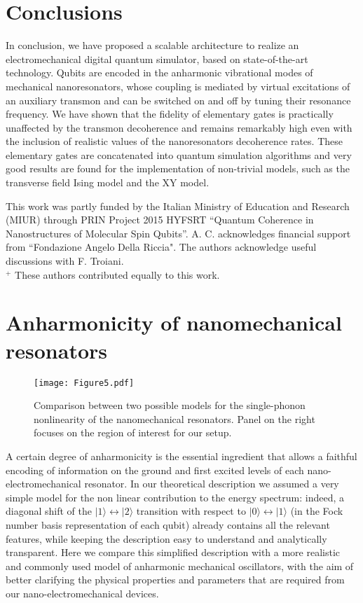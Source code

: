 \documentclass[aps,twocolumn,groupedaddress,superscriptaddress,floatfix,amsmath,amssymb,prb]{revtex4-1}
\begin{document}
\section{Conclusions}
In conclusion, we have proposed a scalable architecture to realize an electromechanical digital quantum simulator, based on state-of-the-art technology.
Qubits are encoded in the anharmonic vibrational modes of mechanical nanoresonators, whose coupling is mediated by virtual excitations of an auxiliary transmon and can be switched on and off by tuning their resonance frequency. We have shown that the fidelity of elementary gates is practically unaffected by the transmon decoherence and remains remarkably high even with the inclusion of realistic values of the nanoresonators decoherence rates. These elementary gates are concatenated into quantum simulation algorithms and very good results are found for the implementation of non-trivial models, such as the transverse field Ising model and the XY model.

\acknowledgements
This work was partly funded by the Italian Ministry of Education and Research (MIUR) through PRIN Project 2015 HYFSRT  ``Quantum Coherence in Nanostructures of Molecular Spin Qubits''. 
A. C. acknowledges financial support from ``Fondazione Angelo Della Riccia". The authors acknowledge useful discussions with F. Troiani. \\
$^+$ These authors contributed equally to this work.

\appendix

\section{Anharmonicity of nanomechanical resonators} 
\label{app:NonLin}

\begin{figure*}[t]
\centering
\texttt{[image: Figure5.pdf]} 
\caption{Comparison between two possible models for the single-phonon nonlinearity of the nanomechanical resonators. Panel on the right focuses on the region of interest for our setup.}
\label{fig:NlModels}
\end{figure*}

A certain degree of anharmonicity is the essential ingredient that allows a faithful encoding of information on the ground and first excited levels of each nano-electromechanical resonator. In our theoretical description we assumed a very simple model for the non linear contribution to the energy spectrum: indeed, a diagonal  shift of the $|1\rangle\leftrightarrow |2\rangle$  transition with respect to $|0\rangle\leftrightarrow |1\rangle$ (in the Fock number basis representation of each qubit) already contains all the relevant features, while keeping the description easy to understand and analytically transparent. Here we compare this simplified description with a more realistic and commonly used model of anharmonic mechanical oscillators, with the aim of better clarifying the physical properties and parameters that are required from our nano-electromechanical devices.
\end{document}
